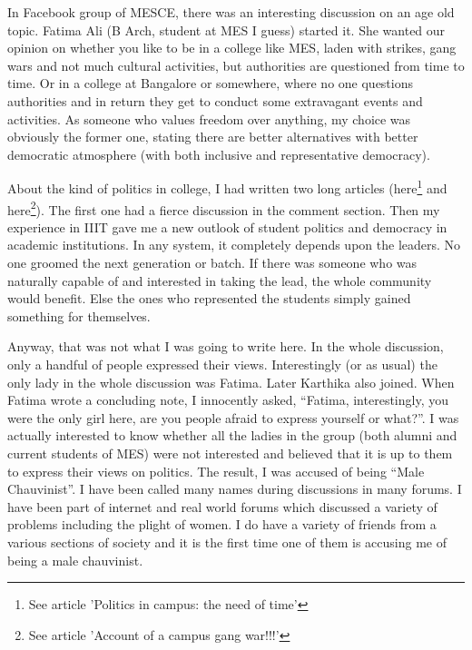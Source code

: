 \vskip 2pt
{\engtext
In Facebook group of MESCE, there was an interesting discussion on an age old topic. 
Fatima Ali (B Arch, student at MES I guess) started it. She wanted our opinion on whether 
you like to be in a college like MES, laden with strikes, gang wars and not much cultural 
activities, but authorities are questioned from time to time. Or in a college at Bangalore 
or somewhere, where no one questions authorities and in return they get to conduct some 
extravagant events and activities. As someone who values freedom over anything, my 
choice was obviously the former one, stating there are better alternatives with better 
democratic atmosphere (with both inclusive and representative democracy).

About the kind of politics in college, I had written two long articles (here\footnote{See article 'Politics in campus: the need of time'} 
and here\footnote{See article 'Account of a campus gang war!!!'}). The first one had a fierce discussion in the comment section. 
Then my experience in IIIT gave me a new outlook of student politics and democracy in academic institutions. 
In any system, it completely depends upon the leaders. No one groomed the next generation or batch. If there 
was someone who was naturally capable of and interested in taking the lead, the whole community would 
benefit. Else the ones who represented the students simply gained something for themselves.

Anyway, that was not what I was going to write here. In the whole discussion, only a handful of people 
expressed their views. Interestingly (or as usual) the only lady in the whole discussion was Fatima. Later 
Karthika also joined. When Fatima wrote a concluding note, I innocently asked, ``Fatima, interestingly, you 
were the only girl here, are you people afraid to express yourself or what?''. I was actually interested to 
know whether all the ladies in the group (both alumni and current students of MES) were not interested 
and believed that it is up to them to express their views on politics. The result, I was accused of being 
``Male Chauvinist''. I have been called many names during discussions in many forums. I have been 
part of internet and real world forums which discussed a variety of problems including the plight of 
women. I do have a variety of friends from a various sections of society and it is the first time one of 
them is accusing me of being a male chauvinist.

}
